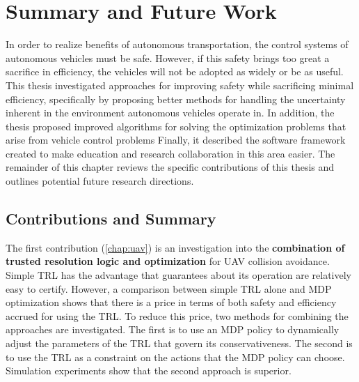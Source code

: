 \chapter{Summary and Future Work}

In order to realize benefits of autonomous transportation, the control systems of autonomous vehicles must be safe.
However, if this safety brings too great a sacrifice in efficiency, the vehicles will not be adopted as widely or be as useful.
This thesis investigated approaches for improving safety while sacrificing minimal efficiency, specifically by proposing better methods for handling the uncertainty inherent in the environment autonomous vehicles operate in.
In addition, the thesis proposed improved algorithms for solving the optimization problems that arise from vehicle control problems
Finally, it described the software framework created to make education and research collaboration in this area easier.
The remainder of this chapter reviews the specific contributions of this thesis and outlines potential future research directions.

\section{Contributions and Summary}

The first contribution (\cref{chap:uav}) is an investigation into the \textbf{combination of trusted resolution logic and optimization} for UAV collision avoidance.
Simple TRL has the advantage that guarantees about its operation are relatively easy to certify.
However, a comparison between simple TRL alone and MDP optimization shows that there is a price in terms of both safety and efficiency accrued for using the TRL.
To reduce this price, two methods for combining the approaches are investigated.
The first is to use an MDP policy to dynamically adjust the parameters of the TRL that govern its conservativeness.
The second is to use the TRL as a constraint on the actions that the MDP policy can choose.
Simulation experiments show that the second approach is superior.

